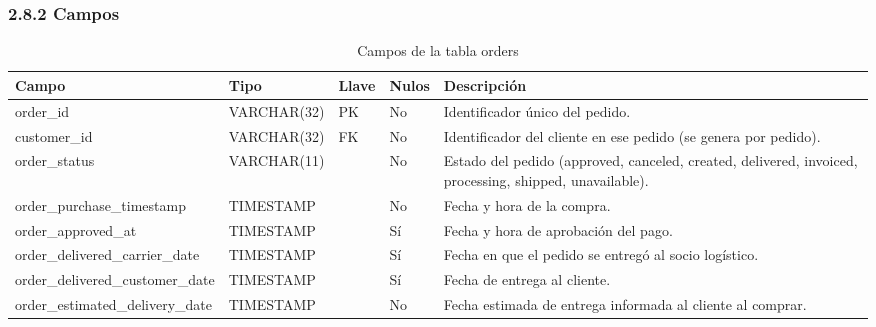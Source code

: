 \documentclass[a4paper,stu,12pt,donotrepeattitle,floatsintext]{apa7}
\begin{document}
\subsubsection{2.8.2 Campos}
{\footnotesize
\begin{longtable}{|>{\raggedright\arraybackslash}p{}|>{\raggedright\arraybackslash}p{}|>{\raggedright\arraybackslash}p{}|>{\raggedright\arraybackslash}p{}|>{\raggedright\arraybackslash}p{}|}
\caption{Campos de la tabla orders}\\
\hline
\textbf{Campo} & \textbf{Tipo} & \textbf{Llave} & \textbf{Nulos} & \textbf{Descripción} \\ \hline
\endhead
order\_\allowbreak{}id & VARCHAR(32) & PK & No & Identificador único del pedido. \\ \hline
customer\_\allowbreak{}id & VARCHAR(32) & FK & No & Identificador del cliente en ese pedido (se genera por pedido). \\ \hline
order\_\allowbreak{}status & VARCHAR(11) &  & No & Estado del pedido (approved, canceled, created, delivered, invoiced, processing, shipped, unavailable). \\ \hline
order\_\allowbreak{}purchase\_\allowbreak{}timestamp & TIMESTAMP &  & No & Fecha y hora de la compra. \\ \hline
order\_\allowbreak{}approved\_\allowbreak{}at & TIMESTAMP &  & Sí & Fecha y hora de aprobación del pago. \\ \hline
order\_\allowbreak{}delivered\_\allowbreak{}carrier\_\allowbreak{}date & TIMESTAMP &  & Sí & Fecha en que el pedido se entregó al socio logístico. \\ \hline
order\_\allowbreak{}delivered\_\allowbreak{}customer\_\allowbreak{}date & TIMESTAMP &  & Sí & Fecha de entrega al cliente. \\ \hline
order\_\allowbreak{}estimated\_\allowbreak{}delivery\_\allowbreak{}date & TIMESTAMP &  & No & Fecha estimada de entrega informada al cliente al comprar. \\ \hline
\end{longtable}
}
\end{document}
